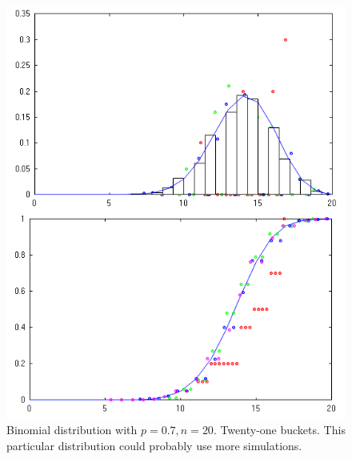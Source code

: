 \documentclass[letterpaper]{article}
\begin{document}
\begin{figure}[ht]
  \centering
  \includegraphics[width=\columnwidth]{2015-11-11_binomial.png}
  \caption{\label{fig:dBinom} Binomial distribution with $p=0.7, n=20$.
    Twenty-one buckets.  This particular distribution could probably use more
    simulations.}
\end{figure}
\end{document}
